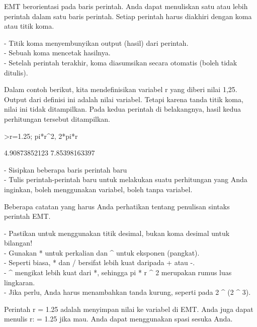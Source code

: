 \documentclass{article}
\begin{document}
\begin{eulernotebook}
\begin{eulercomment}
\begin{eulercomment}
\begin{eulercomment}
\begin{eulercomment}
\begin{eulercomment}
EMT berorientasi pada baris perintah. Anda dapat menuliskan satu atau lebih
perintah dalam satu baris perintah. Setiap perintah harus diakhiri dengan koma
atau titik koma.

- Titik koma menyembunyikan output (hasil) dari perintah.\\
- Sebuah koma mencetak hasilnya.\\
- Setelah perintah terakhir, koma diasumsikan secara otomatis (boleh tidak
ditulis).

Dalam contoh berikut, kita mendefinisikan variabel r yang diberi nilai 1,25.
Output dari definisi ini adalah nilai variabel. Tetapi karena tanda titik koma,
nilai ini tidak ditampilkan. Pada kedua perintah di belakangnya, hasil kedua
perhitungan tersebut ditampilkan.
\end{eulercomment}
\begin{eulerprompt}
>r=1.25; pi*r^2, 2*pi*r
\end{eulerprompt}
\begin{euleroutput}
  4.90873852123
  7.85398163397
\end{euleroutput}
\begin{eulercomment}
- Sisipkan beberapa baris perintah baru\\
- Tulis perintah-perintah baru untuk melakukan suatu perhitungan yang Anda
inginkan, boleh menggunakan variabel, boleh tanpa variabel.\\
\end{eulercomment}
\eulersubheading{}
\begin{eulercomment}
Beberapa catatan yang harus Anda perhatikan tentang penulisan sintaks perintah
EMT.

- Pastikan untuk menggunakan titik desimal, bukan koma desimal untuk bilangan!\\
- Gunakan * untuk perkalian dan \textasciicircum{} untuk eksponen (pangkat).\\
- Seperti biasa, * dan / bersifat lebih kuat daripada + atau -.\\
- \textasciicircum{} mengikat lebih kuat dari *, sehingga pi * r \textasciicircum{} 2 merupakan rumus luas
lingkaran.\\
- Jika perlu, Anda harus menambahkan tanda kurung, seperti pada 2 \textasciicircum{} (2 \textasciicircum{} 3).

Perintah r = 1.25 adalah menyimpan nilai ke variabel di EMT. Anda juga dapat
menulis r: = 1.25 jika mau. Anda dapat menggunakan spasi sesuka Anda.


\end{eulercomment}
\end{eulercomment}
\end{eulercomment}
\end{eulercomment}
\end{eulercomment}
\end{eulernotebook}
\end{document}
